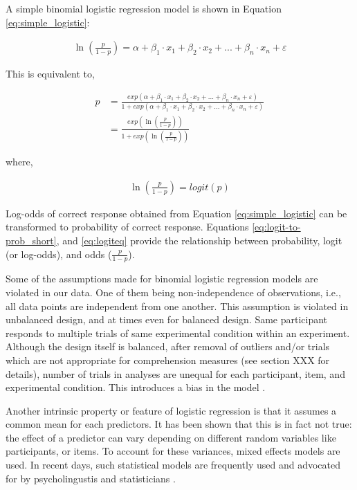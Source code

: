 \documentclass[a4paper, nobind]{templates/ociamthesis}
\begin{document}
A simple binomial logistic regression model is shown in Equation \ref{eq:simple_logistic}:

\begin{align} \label{eq:simple_logistic}
\ln(\frac{p}{1-p}) =
\alpha + 
\beta_{1}\cdot{x_1} + 
\beta_{2}\cdot{x_2} + ... +
\beta_{n}\cdot{x_n} + \varepsilon
\end{align}

This is equivalent to,

\begin{align} \label{eq:logit-to-prob_long}
p &=
{\frac{exp(\alpha + 
\beta_{1}\cdot{x_1} + 
\beta_{2}\cdot{x_2} + ... +
\beta_{n}\cdot{x_n} + \varepsilon)}
{1 + exp (\alpha + 
\beta_{1}\cdot{x_1} + 
\beta_{2}\cdot{x_2} + ... +
\beta_{n}\cdot{x_n} + \varepsilon)}}\\ \label{eq:logit-to-prob_short}
&= {\frac{exp(\ln(\frac{p}{1-p}))}{1 + exp (\ln(\frac{p}{1-p}))}}
\end{align}

where,

\begin{align} \label{eq:logiteq}
\ln(\frac{p}{1-p}) =
{logit}(p)
\end{align}

Log-odds of correct response obtained from Equation \ref{eq:simple_logistic} can be transformed to probability of correct response. Equations \ref{eq:logit-to-prob_short}, and \ref{eq:logiteq} provide the relationship between probability, logit (or log-odds), and odds (\(\frac{p}{1-p}\)).

Some of the assumptions made for binomial logistic regression models are violated in our data.
One of them being non-independence of observations, i.e., all data points are independent from one another.
This assumption is violated in unbalanced design, and at times even for balanced design.
Same participant responds to multiple trials of same experimental condition within an experiment.
Although the design itself is balanced, after removal of outliers and/or trials which are not appropriate for comprehension measures (see section XXX for details), number of trials in analyses are unequal for each participant, item, and experimental condition.
This introduces a bias in the model \autocite{Jaeger2008}.

Another intrinsic property or feature of logistic regression is that it assumes a common mean for each predictors.
It has been shown that this is in fact not true: the effect of a predictor can vary depending on different random variables like participants, or items.
To account for these variances, mixed effects models are used.
In recent days, such statistical models are frequently used and advocated for by psycholingustis and statisticians \autocite{Gries2015,Meteyard2020}.
\end{document}
